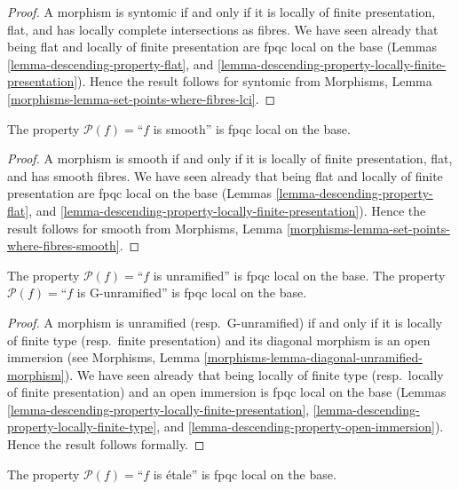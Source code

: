 \begin{proof}
A morphism is syntomic if and only if it is locally of finite presentation,
flat, and has locally complete intersections as fibres. We have seen
already that being flat and locally of finite presentation are
fpqc local on the base (Lemmas
\ref{lemma-descending-property-flat}, and
\ref{lemma-descending-property-locally-finite-presentation}).
Hence the result follows for syntomic from
Morphisms, Lemma \ref{morphisms-lemma-set-points-where-fibres-lci}.
\end{proof}

\begin{lemma}
\label{lemma-descending-property-smooth}
The property $\mathcal{P}(f) =$``$f$ is smooth''
is fpqc local on the base.
\end{lemma}

\begin{proof}
A morphism is smooth if and only if it is locally of finite presentation,
flat, and has smooth fibres. We have seen
already that being flat and locally of finite presentation are
fpqc local on the base (Lemmas
\ref{lemma-descending-property-flat}, and
\ref{lemma-descending-property-locally-finite-presentation}).
Hence the result follows for smooth from
Morphisms, Lemma \ref{morphisms-lemma-set-points-where-fibres-smooth}.
\end{proof}

\begin{lemma}
\label{lemma-descending-property-unramified}
The property $\mathcal{P}(f) =$``$f$ is unramified''
is fpqc local on the base.
The property $\mathcal{P}(f) =$``$f$ is G-unramified''
is fpqc local on the base.
\end{lemma}

\begin{proof}
A morphism is unramified (resp.\ G-unramified) if and only if it is
locally of finite type (resp.\ finite presentation)
and its diagonal morphism is an open immersion (see
Morphisms, Lemma \ref{morphisms-lemma-diagonal-unramified-morphism}).
We have seen already that being locally of finite type
(resp.\ locally of finite presentation) and an open immersion is
fpqc local on the base (Lemmas
\ref{lemma-descending-property-locally-finite-presentation},
\ref{lemma-descending-property-locally-finite-type}, and
\ref{lemma-descending-property-open-immersion}).
Hence the result follows formally.
\end{proof}

\begin{lemma}
\label{lemma-descending-property-etale}
The property $\mathcal{P}(f) =$``$f$ is \'etale''
is fpqc local on the base.
\end{lemma}


